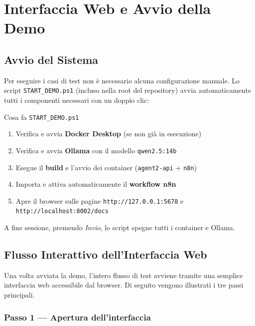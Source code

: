 \documentclass[12pt,a4paper]{report}
\begin{document}
\chapter{Interfaccia Web e Avvio della Demo}

\section{Avvio del Sistema}

Per eseguire i casi di test non è necessario alcuna configurazione manuale.
Lo script \texttt{START\_DEMO.ps1} (incluso nella root del repository) avvia
automaticamente tutti i componenti necessari con un doppio clic:

\begin{technicalbox}{Cosa fa \texttt{START\_DEMO.ps1}}
\begin{enumerate}
  \item Verifica e avvia \textbf{Docker Desktop} (se non già in esecuzione)
  \item Verifica e avvia \textbf{Ollama} con il modello \texttt{qwen2.5:14b}
  \item Esegue il \textbf{build} e l'avvio dei container (\texttt{agent2-api} + \texttt{n8n})
  \item Importa e attiva automaticamente il \textbf{workflow n8n}
  \item Apre il browser sulle pagine \texttt{http://127.0.0.1:5678} e \texttt{http://localhost:8002/docs}
\end{enumerate}
A fine sessione, premendo \textit{Invio}, lo script spegne tutti i container e Ollama.
\end{technicalbox}

\section{Flusso Interattivo dell'Interfaccia Web}

Una volta avviata la demo, l'intero flusso di test avviene tramite una semplice
interfaccia web accessibile dal browser. Di seguito vengono illustrati i tre passi principali.

\subsection{Passo 1 --- Apertura dell'interfaccia}
\end{document}
